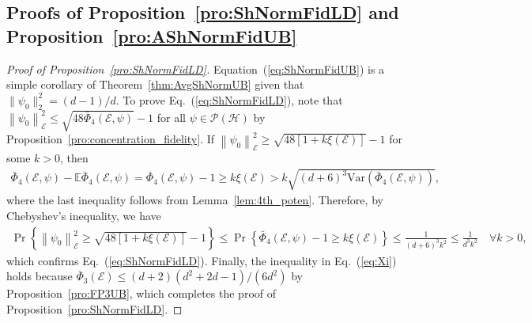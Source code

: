 \documentclass[aps,pra,twocolumn,nofootinbib,superscriptaddress,10pt]{revtex4-2}
\newcommand{\Var}{\mathrm{Var}}
\newcommand{\bbE}{\mathbb{E}}
\newcommand{\caE}{\mathcal{E}}
\newcommand{\caH}{\mathcal{H}}
\newcommand{\caP}{\mathcal{P}}
\newcommand{\bPhi}{\bar{\Phi}}
\newcommand{\eref}[1]{Eq.~\textup{(\ref{#1})}}
\newcommand{\Eref}[1]{Equation~\textup{(\ref{#1})}}
\newcommand{\lref}[1]{Lemma~\ref{#1}}
\newcommand{\pref}[1]{Proposition~\ref{#1}}
\newcommand{\thref}[1]{Theorem~\ref{#1}}
\begin{document}
\subsection{Proofs of \pref{pro:ShNormFidLD} and \pref{pro:AShNormFidUB}}
\begin{proof}[Proof of \pref{pro:ShNormFidLD}]
\Eref{eq:ShNormFidUB} is a simple corollary of \thref{thm:AvgShNormUB} given that $\|\psi_0\|_2^2=(d-1)/d$. To prove \eref{eq:ShNormFidLD}, note that $\left\|\psi_0\right\|_\caE^2\le\sqrt{48\bPhi_4(\caE,\psi)}-1$ for all $\psi\in \caP(\caH)$ by \pref{pro:concentration_fidelity}.
If $ \left\|\psi_0 \right\|_\caE^2\ge \sqrt{48[1+k\xi(\caE)]}-1$ for some $k>0$, then
\begin{align}
\bPhi_4(\caE,\psi)-\bbE \bPhi_4(\caE,\psi) =  \bPhi_4(\caE,\psi)-1\geq k \xi(\caE)>k \sqrt{(d+6)^3\Var(\bPhi_4(\caE,\psi))},
\end{align}
where the last inequality follows from \lref{lem:4th_poten}. Therefore, by Chebyshev's inequality, we have
\begin{align}
    \Pr \left\{ \left\|\psi_0 \right\|_\caE^2 \ge \sqrt{48[1+k\xi(\caE)]}-1\right\} \le \Pr \left\{\bPhi_4(\caE,\psi)-1\ge k \xi(\caE)\right\}
\le\frac{1}{(d+6)^3k^2}\le \frac{1}{d^3k^2}\quad \forall k>0,
\end{align}
which confirms \eref{eq:ShNormFidLD}. Finally, the inequality in \eref{eq:Xi} holds because $\bPhi_3(\caE) \le (d + 2)(d^2 + 2d - 1)/(6d^2)$ by \pref{pro:FP3UB}, which completes the proof of \pref{pro:ShNormFidLD}.
\end{proof}
\end{document}
